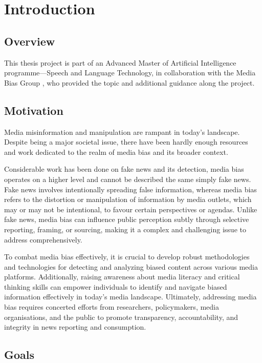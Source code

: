 \chapter{Introduction}
\label{cha:1}

\section{Overview}

This thesis project is part of an Advanced Master of Artificial Intelligence programme—Speech and Language Technology, in collaboration with the Media Bias Group \cite{media-bias-group}, who provided the topic and additional guidance along the project.

\section{Motivation}

Media misinformation and manipulation are rampant in today's landscape. Despite being a major societal issue, there have been hardly enough resources and work dedicated to the realm of media bias and its broader context.

Considerable work has been done on fake news and its detection, media bias operates on a higher level and cannot be described the same simply fake news. Fake news involves intentionally spreading false information, whereas media bias refers to the distortion or manipulation of information by media outlets, which may or may not be intentional, to favour certain perspectives or agendas. Unlike fake news, media bias can influence public perception subtly through selective reporting, framing, or sourcing, making it a complex and challenging issue to address comprehensively.

To combat media bias effectively, it is crucial to develop robust methodologies and technologies for detecting and analyzing biased content across various media platforms. Additionally, raising awareness about media literacy and critical thinking skills can empower individuals to identify and navigate biased information effectively in today's media landscape. Ultimately, addressing media bias requires concerted efforts from researchers, policymakers, media organisations, and the public to promote transparency, accountability, and integrity in news reporting and consumption.

\section{Goals}

